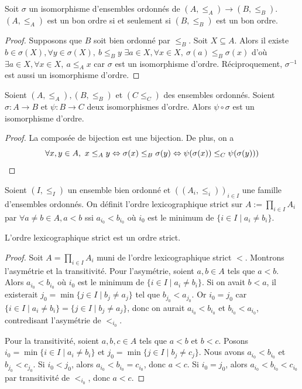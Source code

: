 \begin{proposition}\label{ens : ordre : iso_entre_bo}
    Soit $\sigma$ un isomorphisme d'ensembles ordonnés de $(A,\leq_A)\to (B,\leq_B)$. $(A,\leq_A)$ est un bon ordre si et seulement si $(B,\leq _B)$ est un bon ordre. 
\end{proposition}
\begin{proof}
    Supposons que $B$ soit bien ordonné par $\le_B$. Soit $X\subseteq A$. Alors il existe $b\in \sigma(X),\forall y\in\sigma(
    X),\ b\le_B y$ \ie $\exists a \in X,\forall x\in X,\ \sigma(a)\le_B\sigma(x)$ d'où $\exists a\in X,\forall x\in X,\ a\le_A x$ car $\sigma$ est un isomorphisme d'ordre. Réciproquement, $\sigma^{-1}$ est aussi un isomorphisme d'ordre.
\end{proof}

\begin{proposition}\label{ens : ordre : composée_iso}
    Soient $(A,\le_A), (B,\le_B)$ et $(C\le_C)$ des ensembles ordonnés. Soient $\sigma : A\to B$ et $\psi : B\to C$ deux isomorphismes d'ordre. Alors $\psi \circ \sigma$ est un isomorphisme d'ordre.
\end{proposition}
\begin{proof}
    La composée de bijection est une bijection. De plus, on a $$\forall x,y\in A,\ x\le_Ay\Leftrightarrow \sigma(x)\le_B \sigma(y)\Leftrightarrow \psi(\sigma(x))\le_C\psi(\sigma(y)))$$
\end{proof}
\begin{definition}
    Soient $(I,\le_I)$ un ensemble bien ordonné et $((A_i,\le_i))_{i\in I}$ une famille d'ensembles ordonnés. On définit l'ordre lexicographique strict sur $A:=\prod_{i\in I}A_i$ par $\forall a\ne b\in A, a<b$ ssi $a_{i_0}<b_{i_0}$ où $i_0$ est le minimum de $\{ i\in I\mid a_i\ne b_i\}$.
\end{definition}
\begin{proposition}
    L'ordre lexicographique strict est un ordre strict.
\end{proposition}
\begin{proof}
    Soit $A = \prod_{i \in I} A_i$ muni de l'ordre lexicographique strict $<$. Montrons l'asymétrie et la transitivité.
Pour l'asymétrie, soient $a, b \in A$ tels que $a < b$. Alors $a_{i_0} < b_{i_0}$ où $i_0$ est le minimum de $\{i \in I \mid a_i \neq b_i\}$. Si on avait $b < a$, il existerait $j_0 = \min\{j \in I \mid b_j \neq a_j\}$ tel que $b_{j_0} < a_{j_0}$. Or $i_0 = j_0$ car $\{i \in I \mid a_i \neq b_i\} = \{j \in I \mid b_j \neq a_j\}$, donc on aurait $a_{i_0} < b_{i_0}$ et $b_{i_0} < a_{i_0}$, contredisant l'asymétrie de $<_{i_0}$.

Pour la transitivité, soient $a, b, c \in A$ tels que $a < b$ et $b < c$. Posons $i_0 = \min\{i \in I \mid a_i \neq b_i\}$ et $j_0 = \min\{j \in I \mid b_j \neq c_j\}$. Nous avons $a_{i_0} < b_{i_0}$ et $b_{j_0} < c_{j_0}$. Si $i_0 < j_0$, alors  $a_{i_0} < b_{i_0} = c_{i_0}$, donc $a < c$. Si $i_0 = j_0$, alors $a_{i_0} < b_{i_0} < c_{i_0}$ par transitivité de $<_{i_0}$, donc $a < c$.
\end{proof}

